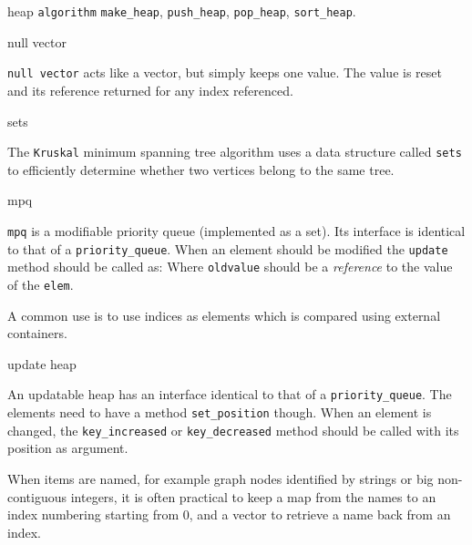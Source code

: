\begin{algorithm}{heap}
{\tt algorithm}
\usage{}
{\tt make\_heap}, {\tt push\_heap}, {\tt pop\_heap}, {\tt sort\_heap}.
\end{algorithm}

\begin{algorithm}{null vector}

{\tt null vector} acts like a vector, but simply keeps one value.
The value is reset and its reference returned for any index referenced.
\end{algorithm}

\begin{algorithm}{sets}

The {\tt Kruskal} minimum spanning tree algorithm uses a data structure
called {\tt sets} to efficiently determine whether two vertices belong to
the same tree.
\end{algorithm}

\begin{algorithm}{mpq}

{\tt mpq} is a modifiable priority queue (implemented as a set). Its interface
is identical to that of a {\tt priority\_queue}. When an element should be
modified the {\tt update} method should be called as:
Where {\tt oldvalue} should be a \emph{reference} to the value of the
{\tt elem}.

A common use is to use indices as elements which is compared using external
containers.
\end{algorithm}

\begin{algorithm}{update heap}

An updatable heap has an interface identical to that of a
{\tt priority\_queue}.
The elements need to have a method {\tt set\_position} though. When an element
is changed, the {\tt key\_increased} or {\tt key\_decreased} method should
be called with its position as argument.
\end{algorithm}

When items are named, for example graph nodes identified by strings or big
non-contiguous integers, it is often practical to keep a map from the
names to an index numbering starting from 0, and a vector to retrieve a name
back from an index.

